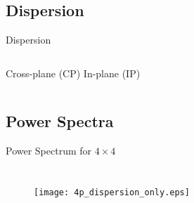 \documentclass{beamer}
\begin{document}
\subsection{Dispersion}
\begin{frame}{\small{Dispersion}}
\begin{columns}
Cross-plane (CP)
\newline
\newline
\newline
\newline
\newline
In-plane (IP)
\begin{figure}[!h]
\vspace*{-0.8cm}
\begin{center}
\renewcommand{\figure}{Fig.}
\label{fig:sed}
\end{center}
\end{figure}
\begin{figure}[!h]
\vspace*{-0.8cm}
\begin{center}
\renewcommand{\figure}{Fig.}
\label{fig:dispersion}
\end{center}
\end{figure}
\end{columns}
\end{frame}


\subsection{Power Spectra}
\begin{frame}{Power Spectrum for $4 \times 4$}
\begin{columns}
\begin{figure}[t]
\vspace*{-1cm}
\hspace*{-0.9cm}
\texttt{[image: 4p\_dispersion\_only.eps]}
\renewcommand{\figure}{Fig.}
\label{fig:disp_4p}
\end{figure}
\begin{figure}[t]
\vspace*{-1.2cm}
\hspace*{1.9cm}
\renewcommand{\figure}{Fig.}
\label{fig:sed}
\end{figure}
\end{columns}
\end{frame}
\end{document}
